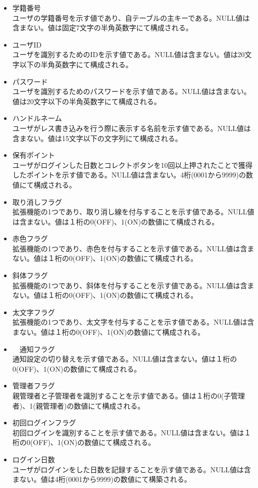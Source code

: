 \documentclass[a4j]{jarticle}
\begin{document}
\begin{itemize}
\item 学籍番号\\
  ユーザの学籍番号を示す値であり、自テーブルの主キーである。NULL値は含まない。値は固定7文字の半角英数字にて構成される。
\item ユーザID\\
  ユーザを識別するためのIDを示す値である。NULL値は含まない。値は20文字以下の半角英数字にて構成される。
\item パスワード\\
  ユーザを識別するためのパスワードを示す値である。NULL値は含まない。値は20文字以下の半角英数字にて構成される。
\item ハンドルネーム\\
      ユーザがレス書き込みを行う際に表示する名前を示す値である。NULL値は含まない。値は15文字以下の文字列にて構成される。


\item 保有ポイント\\
  ユーザがログインした日数とコレクトボタンを10回以上押されたことで獲得したポイントを示す値である。NULL値は含まない。4桁(0001から9999)の数値にて構成される。

\item 取り消しフラグ\\
  拡張機能の1つであり、取り消し線を付与することを示す値である。NULL値は含まない。値は１桁の0(OFF)、1(ON)の数値にて構成される。

\item 赤色フラグ\\
  拡張機能の1つであり、赤色を付与することを示す値である。NULL値は含まない。値は１桁の0(OFF)、1(ON)の数値にて構成される。\\
\item 斜体フラグ\\
  拡張機能の1つであり、斜体を付与することを示す値である。NULL値は含まない。値は１桁の0(OFF)、1(ON)の数値にて構成される。

\item 太文字フラグ\\
  拡張機能の1つであり、太文字を付与することを示す値である。NULL値は含まない。値は１桁の0(OFF)、1(ON)の数値にて構成される。
\item　通知フラグ\\
  通知設定の切り替えを示す値である。NULL値は含まない。値は１桁の0(OFF)、1(ON)の数値にて構成される。
\item 管理者フラグ\\
  親管理者と子管理者を識別することを示す値である。値は１桁の0(子管理者)、1(親管理者)の数値にて構成される。\\
\item 初回ログインフラグ\\
  初回ログインを識別することを示す値である。NULL値は含まない。値は１桁の0(OFF)、1(ON)の数値にて構成される。

\item ログイン日数\\
  ユーザがログインをした日数を記録することを示す値である。NULL値は含まない。値は4桁(0001から9999)の数値にて構築される。

  　\end{itemize}
\newpage
\end{document}
